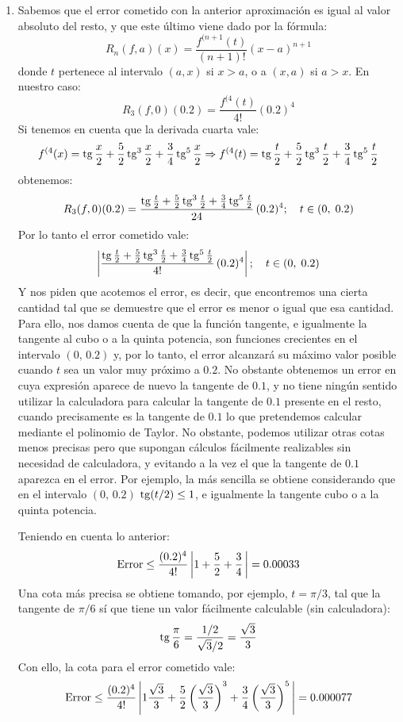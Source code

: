 {\begin{enumerate}
Y la aproximación buscada vale:
\[
\tg 0.1 \approx T_3 (f,0)(0.2) = \frac{1}{2}\;0.2 +
\frac{1}{{24}}\;0.2^3  = 0.1003333
\]
Para comprobar que la aproximación obtenida es correcta, mediante
calculadora, utilizando como unidad angular el radián, obtenemos:
$\tg 0.1=0.1003346$


\item Sabemos que el error cometido con la anterior aproximación es
igual al valor absoluto del resto, y que este último viene dado por
la fórmula:
\[
R_n (f,a)(x) = \frac{{f^{(n + 1} (t)}}{{(n + 1)!}}(x - a)^{n + 1}
\]
donde $t$ pertenece al intervalo $(a,x)$ si $x>a$, o a $(x,a)$ si
$a>x$.
En nuestro caso:
\[
R_3 (f,0)(0.2) = \frac{{f^{(4} (t)}}{{4!}}(0.2)^{4}
\]
Si tenemos en cuenta que la derivada cuarta vale:
\[
f^{(4} (x) = \operatorname{tg} \frac{x}{2} + \frac{5}{2}\operatorname{tg} ^3 \frac{x}{2} +
\frac{3}{4}\operatorname{tg} ^5 \frac{x}{2} \Rightarrow f^{(4} (t) = \operatorname{tg}
\frac{t}{2} + \frac{5}{2}\operatorname{tg} ^3 \frac{t}{2} + \frac{3}{4}\operatorname{tg} ^5
\frac{t}{2}
\]
obtenemos:
\[
R_3 (f,0)(0.2) = \frac{{\operatorname{tg} \frac{t}{2} + \frac{5}{2}\operatorname{tg} ^3
\frac{t}{2} + \frac{3}{4}\operatorname{tg} ^5 \frac{t}{2}}}{{24}}\,(0.2)^4 ;\quad
t \in (0,\;0.2)
\]
Por lo tanto el error cometido vale:
\[
\left| {\frac{{\operatorname{tg} \frac{t}{2} + \frac{5}{2}\operatorname{tg} ^3 \frac{t}{2} +
\frac{3}{4}\operatorname{tg} ^5 \frac{t}{2}}}{{4!}}\,(0.2)^4 } \right|;\quad t
\in (0,\;0.2)
\]
Y nos piden que acotemos el error, es decir, que encontremos una
cierta cantidad tal que se demuestre que el error es menor o igual
que esa cantidad. Para ello, nos damos cuenta de que la función
tangente, e igualmente la tangente al cubo o a la quinta potencia,
son funciones crecientes en el intervalo $(0,\,0.2)$ y, por lo
tanto, el error alcanzará su máximo valor posible cuando $t$ sea un
valor muy próximo a $0.2$. No obstante obtenemos un error en cuya
expresión aparece de nuevo la tangente de $0.1$, y no tiene ningún
sentido utilizar la calculadora para calcular la tangente de $0.1$
presente en el resto, cuando precisamente es la tangente de $0.1$ lo
que pretendemos calcular mediante el polinomio de Taylor. No
obstante, podemos utilizar otras cotas menos precisas pero que
supongan cálculos fácilmente realizables sin necesidad de
calculadora, y evitando a la vez el que la tangente de $0.1$
aparezca en el error. Por ejemplo, la más sencilla se obtiene
considerando que en el intervalo $(0,\,0.2)$ $\operatorname{tg}(t/2)\leq 1$, e
igualmente la tangente cubo o a la quinta potencia.

Teniendo en cuenta lo anterior:
\[
{\rm Error} \le \frac{{(0.2)^4 }}{{4!}}\left| {1 + \frac{5}{2} +
\frac{3}{4}\,} \right| = 0.00033
\]
Una cota más precisa se obtiene tomando, por ejemplo, $t=\pi/3$, tal
que la tangente de $\pi/6$ sí que tiene un valor fácilmente
calculable (sin calculadora):
\[
\operatorname{tg} \frac{\pi }{6} = \frac{{1/2}}{{\sqrt 3 /2}} = \frac{{\sqrt 3
}}{3}
\]
Con ello, la cota para el error cometido vale:
\[
{\rm Error} \le \frac{{(0.2)^4 }}{{4!}}\left| {1\frac{{\sqrt 3 }}{3}
+ \frac{5}{2}\left( {\frac{{\sqrt 3 }}{3}} \right)^3  +
\frac{3}{4}\left( {\frac{{\sqrt 3 }}{3}} \right)^5 \,} \right| =
0.000077
\]
\end{enumerate}
}


